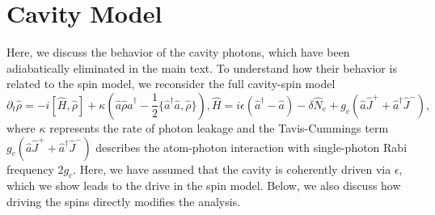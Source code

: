 \documentclass[11pt]{article}
\begin{document}
\section{Cavity Model}
\label{sec:cavity}

Here, we discuss the behavior of the cavity photons, which have been adiabatically eliminated in the main text. To understand how their behavior is related to the spin model, we reconsider the full cavity-spin model
\begin{subequations}
\begin{equation}
    \partial_t \hat \rho = -i [\hat H, \hat \rho] + \kappa (\hat a \hat \rho \hat a^\dagger - \frac{1}{2} \{ \hat a^\dagger \hat a, \hat \rho \}),
\end{equation}
\begin{equation}
    \hat H = i \epsilon (\hat a^\dagger - \hat a) - \delta \hat N_e + g_c (\hat a \hat J^+ + \hat a^\dagger \hat J^-),
\end{equation}
\end{subequations}
where $\kappa$ represents the rate of photon leakage and the Tavis-Cummings term $g_c (\hat a \hat J^+ + \hat a^\dagger \hat J^-)$ describes the atom-photon interaction with single-photon Rabi frequency $2 g_c$. Here, we have assumed that the cavity is coherently driven via $\epsilon$, which we show leads to the drive in the spin model. Below, we also discuss how driving the spins directly modifies the analysis.
\end{document}
